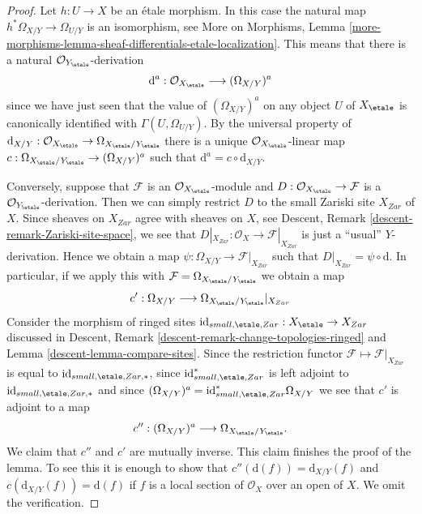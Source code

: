 \begin{proof}
Let $h : U \to X$ be an \'etale morphism. In this case the natural map
$h^*\Omega_{X/Y} \to \Omega_{U/Y}$ is an isomorphism, see
More on Morphisms,
Lemma \ref{more-morphisms-lemma-sheaf-differentials-etale-localization}.
This means that there is a natural $\mathcal{O}_{Y_\etale}$-derivation
$$
\text{d}^a : \mathcal{O}_{X_\etale} \longrightarrow (\Omega_{X/Y})^a
$$
since we have just seen that the value of $(\Omega_{X/Y})^a$ on any object
$U$ of $X_\etale$ is canonically identified with
$\Gamma(U, \Omega_{U/Y})$. By the universal property of
$\text{d}_{X/Y} :
\mathcal{O}_{X_\etale}
\to
\Omega_{X_\etale/Y_\etale}$
there is a unique $\mathcal{O}_{X_\etale}$-linear map
$c : \Omega_{X_\etale/Y_\etale} \to (\Omega_{X/Y})^a$
such that
$\text{d}^a = c \circ \text{d}_{X/Y}$.

\medskip\noindent
Conversely, suppose that $\mathcal{F}$ is an
$\mathcal{O}_{X_\etale}$-module
and $D : \mathcal{O}_{X_\etale} \to \mathcal{F}$ is a
$\mathcal{O}_{Y_\etale}$-derivation. Then we can simply restrict
$D$ to the small Zariski site $X_{Zar}$ of $X$. Since sheaves on $X_{Zar}$
agree with sheaves on $X$, see
Descent, Remark \ref{descent-remark-Zariski-site-space},
we see that $D|_{X_{Zar}} : \mathcal{O}_X \to \mathcal{F}|_{X_{Zar}}$
is just a ``usual'' $Y$-derivation. Hence we obtain a map
$\psi : \Omega_{X/Y} \longrightarrow \mathcal{F}|_{X_{Zar}}$
such that $D|_{X_{Zar}} = \psi \circ \text{d}$. In particular, if we
apply this with $\mathcal{F} = \Omega_{X_\etale/Y_\etale}$
we obtain a map
$$
c' :
\Omega_{X/Y}
\longrightarrow
\Omega_{X_\etale/Y_\etale}|_{X_{Zar}}
$$
Consider the morphism of ringed sites
$\text{id}_{small, \etale, Zar} : X_\etale \to X_{Zar}$
discussed in
Descent, Remark \ref{descent-remark-change-topologies-ringed} and
Lemma \ref{descent-lemma-compare-sites}.
Since the restriction functor $\mathcal{F} \mapsto \mathcal{F}|_{X_{Zar}}$
is equal to $\text{id}_{small, \etale, Zar, *}$, since
$\text{id}_{small, \etale, Zar}^*$ is left adjoint to
$\text{id}_{small, \etale, Zar, *}$ and since
$(\Omega_{X/Y})^a = \text{id}_{small, \etale, Zar}^*\Omega_{X/Y}$
we see that $c'$ is adjoint to a map
$$
c'' :
(\Omega_{X/Y})^a
\longrightarrow
\Omega_{X_\etale/Y_\etale}.
$$
We claim that $c''$ and $c'$ are mutually inverse.
This claim finishes the proof of the lemma.
To see this it is enough to show that $c''(\text{d}(f)) = \text{d}_{X/Y}(f)$
and $c(\text{d}_{X/Y}(f)) = \text{d}(f)$ if $f$ is a local section of
$\mathcal{O}_X$ over an open of $X$. We omit the verification.
\end{proof}

